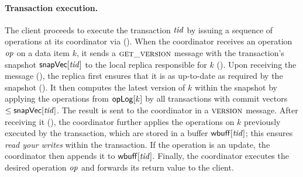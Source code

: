 \paragraph{Transaction execution.}  The client proceeds to execute the
transaction $\tx$ by issuing a sequence of operations at its coordinator via
\UPDATETX{} (). When the coordinator
receives an operation $\op$ on a data item $k$, it sends a $\textsc{get\_version}$ message
with the transaction's snapshot $\vecsnapshottime[\tx]$ to the local replica
responsible for $k$
(). Upon receiving the message
(), the replica first
ensures that it is as up-to-date as required by the snapshot
(). It then computes the latest
version of $k$ within the snapshot by applying the operations from ${\sf opLog}[k]$
by all transactions
with commit vectors $\leq \vecsnapshottime[\tx]$. The result is sent to the
coordinator in a $\textsc{version}$ message. After receiving it
(), the coordinator further
applies the operations on $k$ previously executed by the transaction, which are
stored in a buffer $\writeset[\tx]$; this ensures {\em read your writes} within
the transaction. If the operation is an update, the coordinator then appends
it to $\writeset[\tx]$. Finally, the coordinator executes the desired operation
$\op$ and forwards its return value to the client.




